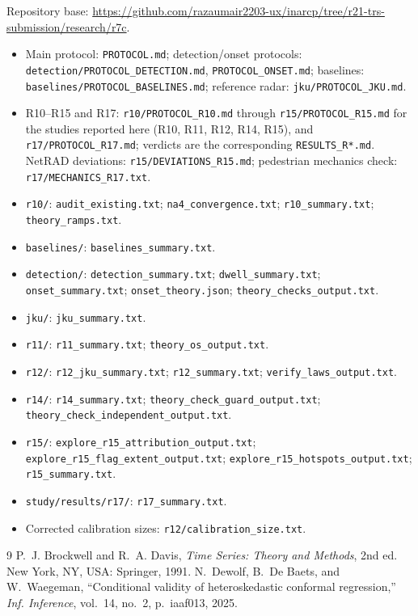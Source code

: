 \documentclass[10pt]{article}
\begin{document}
\noindent Repository base: \url{https://github.com/razaumair2203-ux/inarcp/tree/r21-trs-submission/research/r7c}.
\begin{itemize}\setlength{\itemsep}{1pt}\setlength{\parsep}{0pt}\setlength{\topsep}{4pt}
\item Main protocol: \texttt{PROTOCOL.md}; detection/onset protocols: \texttt{detection/PROTOCOL\_DETECTION.md}, \texttt{PROTOCOL\_ONSET.md}; baselines: \texttt{baselines/PROTOCOL\_BASELINES.md}; reference radar: \texttt{jku/PROTOCOL\_JKU.md}.
\item R10--R15 and R17: \texttt{r10/PROTOCOL\_R10.md} through \texttt{r15/PROTOCOL\_R15.md} for the studies reported here (R10, R11, R12, R14, R15), and \texttt{r17/PROTOCOL\_R17.md}; verdicts are the corresponding \texttt{RESULTS\_R*.md}. NetRAD deviations: \texttt{r15/DEVIATIONS\_R15.md}; pedestrian mechanics check: \texttt{r17/MECHANICS\_R17.txt}.

\item \texttt{r10/}: \texttt{audit\_existing.txt}; \texttt{na4\_convergence.txt}; \texttt{r10\_summary.txt}; \texttt{theory\_ramps.txt}.
\item \texttt{baselines/}: \texttt{baselines\_summary.txt}.
\item \texttt{detection/}: \texttt{detection\_summary.txt}; \texttt{dwell\_summary.txt}; \texttt{onset\_summary.txt}; \texttt{onset\_theory.json}; \texttt{theory\_checks\_output.txt}.
\item \texttt{jku/}: \texttt{jku\_summary.txt}.
\item \texttt{r11/}: \texttt{r11\_summary.txt}; \texttt{theory\_os\_output.txt}.
\item \texttt{r12/}: \texttt{r12\_jku\_summary.txt}; \texttt{r12\_summary.txt}; \texttt{verify\_laws\_output.txt}.
\item \texttt{r14/}: \texttt{r14\_summary.txt}; \texttt{theory\_check\_guard\_output.txt}; \texttt{theory\_check\_independent\_output.txt}.
\item \texttt{r15/}: \texttt{explore\_r15\_attribution\_output.txt}; \texttt{explore\_r15\_flag\_extent\_output.txt}; \texttt{explore\_r15\_hotspots\_output.txt}; \texttt{r15\_summary.txt}.
\item \texttt{study/results/r17/}: \texttt{r17\_summary.txt}.
\item Corrected calibration sizes: \texttt{r12/calibration\_size.txt}.
\end{itemize}
\begin{thebibliography}{9}
 P.~J. Brockwell and R.~A. Davis, \emph{Time Series: Theory and Methods}, 2nd ed. New York, NY, USA: Springer, 1991.
 N.~Dewolf, B.~De Baets, and W.~Waegeman, ``Conditional validity of heteroskedastic conformal regression,'' \emph{Inf. Inference}, vol.~14, no.~2, p.~iaaf013, 2025.
\end{thebibliography}
\end{document}
